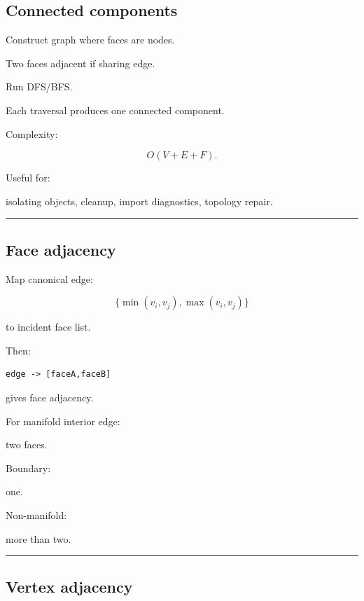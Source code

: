 \subsection{Connected components}\label{04-visual-computing-ii-ch041-connected-components}

\hypertarget{04-visual-computing-ii-ch041-connected-components}{}

Construct graph where faces are nodes.

Two faces adjacent if sharing edge.

Run DFS/BFS.

Each traversal produces one connected component.

Complexity:

\[
O(V+E+F).
\]

Useful for:

isolating objects, cleanup, import diagnostics, topology repair.

\begin{center}\rule{0.5\linewidth}{0.5pt}\end{center}

\subsection{Face adjacency}\label{04-visual-computing-ii-ch041-face-adjacency}

\hypertarget{04-visual-computing-ii-ch041-face-adjacency}{}

Map canonical edge:

\[
\{\min(v_i,v_j),\max(v_i,v_j)\}
\]

to incident face list.

Then:

\begin{verbatim}
edge -> [faceA,faceB]
\end{verbatim}

gives face adjacency.

For manifold interior edge:

two faces.

Boundary:

one.

Non-manifold:

more than two.

\begin{center}\rule{0.5\linewidth}{0.5pt}\end{center}

\subsection{Vertex adjacency}\label{04-visual-computing-ii-ch041-vertex-adjacency}

